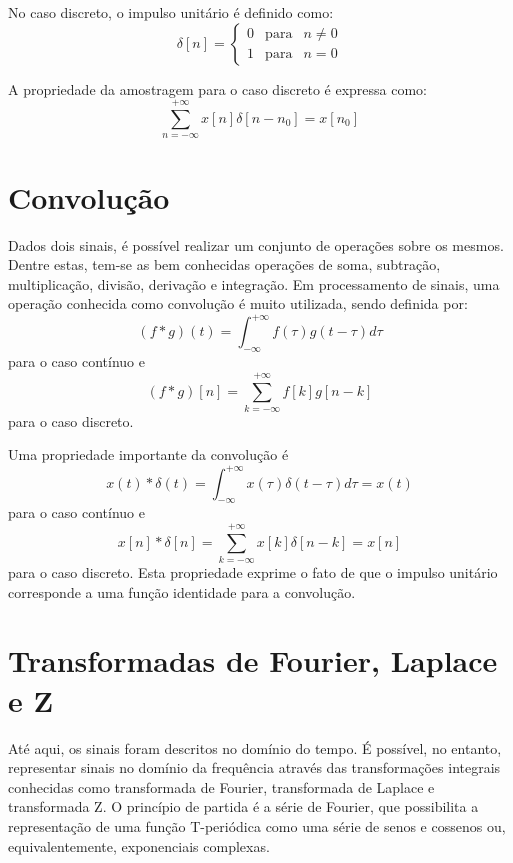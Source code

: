 \documentclass[12pt,a4paper]{report}
\begin{document}
  No caso discreto, o impulso unitário é definido como:
  \begin{equation}
    \delta[n] =
      \left
      \{
      \begin{array}{rcl}
        0 & \mbox{para} & n \neq 0 \\
        1 & \mbox{para} & n = 0
      \end{array}
      \right.
  \end{equation}

  A propriedade da amostragem para o caso discreto é expressa como:
  \begin{equation}
    \sum_{n = -\infty}^{+\infty} x[n] \delta[n-n_0] = x[n_0]
  \end{equation}

\section{Convolução}
  Dados dois sinais, é possível realizar um conjunto de operações sobre os mesmos. Dentre estas, tem-se as bem
  conhecidas operações de soma, subtração, multiplicação, divisão, derivação e integração. Em processamento
  de sinais, uma operação conhecida como convolução é muito utilizada, sendo definida por:
  \begin{equation}
    (f \ast g)(t) = \int_{-\infty}^{+\infty} f(\tau) g(t - \tau) d\tau
  \end{equation}
  para o caso contínuo e
  \begin{equation}
    (f \ast g)[n] = \sum_{k = -\infty}^{+\infty} f[k] g[n - k]
  \end{equation}
  para o caso discreto.

  Uma propriedade importante da convolução é
  \begin{equation}
    x(t) \ast \delta(t) = \int_{-\infty}^{+\infty} x(\tau) \delta(t - \tau) d\tau = x(t)
  \end{equation}
  para o caso contínuo e
  \begin{equation}
    x[n] \ast \delta[n] = \sum_{k = -\infty}^{+\infty} x[k] \delta[n - k] = x[n]
  \end{equation}
  para o caso discreto. Esta propriedade exprime o fato de que o impulso unitário corresponde a uma função
  identidade para a convolução.
  
\section{Transformadas de Fourier, Laplace e Z}
  Até aqui, os sinais foram descritos no domínio do tempo. É possível, no entanto, representar sinais no
  domínio da frequência através das transformações integrais conhecidas como transformada de Fourier,
  transformada de Laplace e transformada Z. O princípio de partida é a série de Fourier, que possibilita
  a representação de uma função T-periódica como uma série de senos e cossenos ou, equivalentemente,
  exponenciais complexas.
\end{document}
